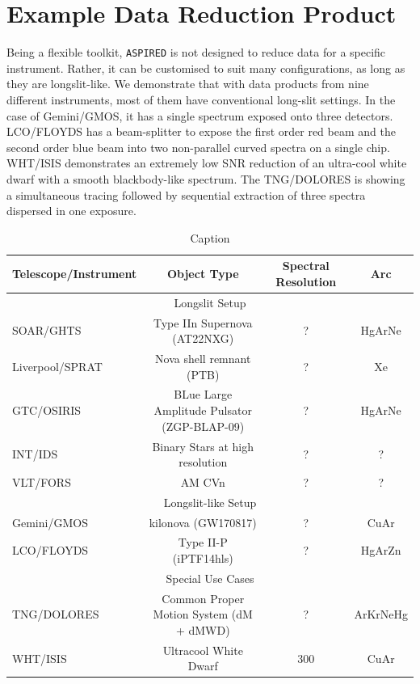 \documentclass[twocolumn, linenumbers]{aastex631}
\begin{document}
\section{Example Data Reduction Product}
Being a flexible toolkit, \texttt{ASPIRED} is not designed to reduce data for a
specific instrument. Rather, it can be customised to suit many configurations,
as long as they are longslit-like. We demonstrate that with data products
from nine different instruments, most of them have conventional long-slit settings.
In the case of Gemini/GMOS, it has a single spectrum exposed onto three detectors.
LCO/FLOYDS has a beam-splitter to expose the first order red beam and the
second order blue beam into two non-parallel curved spectra on a single chip.
WHT/ISIS demonstrates an extremely low SNR reduction of an ultra-cool white
dwarf with a smooth blackbody-like spectrum. The TNG/DOLORES is showing a
simultaneous tracing followed by sequential extraction of three spectra
dispersed in one exposure.

\begin{table}
    \centering
    \begin{tabular}{l|c|c|c}\hline
        Telescope/Instrument & Object Type                                 & Spectral Resolution & Arc \\\hline\hline
        \multicolumn{4}{c}{Longslit Setup}\\\hline
        SOAR/GHTS            & Type IIn Supernova (AT22NXG)                & ?                   & HgArNe \\
        Liverpool/SPRAT      & Nova shell remnant (PTB)                    & ?                   & Xe \\
        GTC/OSIRIS           & BLue Large Amplitude Pulsator (ZGP-BLAP-09) & ?                   & HgArNe \\
        INT/IDS              & Binary Stars at high resolution             & ?                   & ? \\
        VLT/FORS             & AM CVn                                      & ?                   & ? \\\hline
        \multicolumn{4}{c}{Longslit-like Setup}\\\hline
        Gemini/GMOS          & kilonova (GW170817)                         & ?                   & CuAr \\
        LCO/FLOYDS           & Type II-P (iPTF14hls)                       & ?                   & HgArZn \\\hline
        \multicolumn{4}{c}{Special Use Cases}\\\hline
        TNG/DOLORES          & Common Proper Motion System (dM + dMWD)     & ?                   & ArKrNeHg \\
        WHT/ISIS             & Ultracool White Dwarf                       & 300                 & CuAr \\\hline
\end{tabular}
    \caption{Caption}
    \label{tab:my_label}
\end{table}
\end{document}
